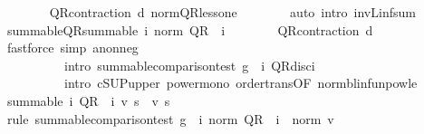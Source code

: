 \begin{isabellebody}
\ \ \ \ \ \ \isamarkupfalse%
\ QR{\isacharunderscore}{\kern0pt}contraction\ d\ norm{\isacharunderscore}{\kern0pt}QR{\isacharunderscore}{\kern0pt}less{\isacharunderscore}{\kern0pt}one\isanewline
\ \ \ \ \ \ \isamarkupfalse%
\ {\isacharparenleft}{\kern0pt}auto\ intro{\isacharbang}{\kern0pt}{\isacharcolon}{\kern0pt}\ inv\isactrlsub L{\isacharunderscore}{\kern0pt}inf{\isacharunderscore}{\kern0pt}sum{\isacharparenright}{\kern0pt}\isanewline
\ \ \ \ \isamarkupfalse%
\ summable{\isacharunderscore}{\kern0pt}QR{\isacharcolon}{\kern0pt}{\isachardoublequoteopen}summable\ {\isacharparenleft}{\kern0pt}{\isasymlambda}i{\isachardot}{\kern0pt}\ norm\ {\isacharparenleft}{\kern0pt}{\isacharquery}{\kern0pt}QR\ {\isacharcircum}{\kern0pt}{\isacharcircum}{\kern0pt}\ i{\isacharparenright}{\kern0pt}{\isacharparenright}{\kern0pt}{\isachardoublequoteclose}\isanewline
\ \ \ \ \ \ \isamarkupfalse%
\ QR{\isacharunderscore}{\kern0pt}contraction\ d\isanewline
\ \ \ \ \ \ \isamarkupfalse%
\ {\isacharparenleft}{\kern0pt}fastforce\ simp{\isacharcolon}{\kern0pt}\ a{\isacharunderscore}{\kern0pt}nonneg\isanewline
\ \ \ \ \ \ \ \ \ \ intro{\isacharcolon}{\kern0pt}\ summable{\isacharunderscore}{\kern0pt}comparison{\isacharunderscore}{\kern0pt}test{\isacharprime}{\kern0pt}{\isacharbrackleft}{\kern0pt}\ g\ {\isacharequal}{\kern0pt}\ {\isachardoublequoteopen}{\isasymlambda}i{\isachardot}{\kern0pt}\ QR{\isacharunderscore}{\kern0pt}disc{\isacharcircum}{\kern0pt}i{\isachardoublequoteclose}{\isacharbrackright}{\kern0pt}\ \isanewline
\ \ \ \ \ \ \ \ \ \ intro{\isacharbang}{\kern0pt}{\isacharcolon}{\kern0pt}\ cSUP{\isacharunderscore}{\kern0pt}upper{}\ power{\isacharunderscore}{\kern0pt}mono\ order{\isachardot}{\kern0pt}trans{\isacharbrackleft}{\kern0pt}OF\ norm{\isacharunderscore}{\kern0pt}blinfunpow{\isacharunderscore}{\kern0pt}le{\isacharbrackright}{\kern0pt}{\isacharparenright}{\kern0pt}\isanewline
\ \ \ \ \isamarkupfalse%
\ {\isachardoublequoteopen}summable\ {\isacharparenleft}{\kern0pt}{\isasymlambda}i{\isachardot}{\kern0pt}\ {\isacharparenleft}{\kern0pt}{\isacharquery}{\kern0pt}QR\ {\isacharcircum}{\kern0pt}{\isacharcircum}{\kern0pt}\ i{\isacharparenright}{\kern0pt}\ v\ s{\isacharparenright}{\kern0pt}{\isachardoublequoteclose}\ \ v\ s\ \isanewline
\ \ \ \ \ \ \isamarkupfalse%
\ {\isacharparenleft}{\kern0pt}rule\ summable{\isacharunderscore}{\kern0pt}comparison{\isacharunderscore}{\kern0pt}test{\isacharprime}{\kern0pt}{\isacharbrackleft}{\kern0pt}\ g\ {\isacharequal}{\kern0pt}\ {\isachardoublequoteopen}{\isasymlambda}i{\isachardot}{\kern0pt}\ norm\ {\isacharparenleft}{\kern0pt}{\isacharquery}{\kern0pt}QR\ {\isacharcircum}{\kern0pt}{\isacharcircum}{\kern0pt}\ i{\isacharparenright}{\kern0pt}\ {\isacharasterisk}{\kern0pt}\ norm\ v{\isachardoublequoteclose}{\isacharbrackright}{\kern0pt}{\isacharparenright}{\kern0pt}\isanewline

\end{isabellebody}
